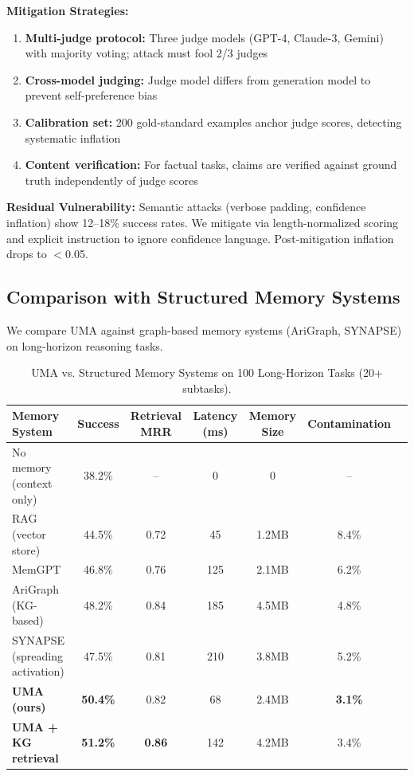 \documentclass{article}
\theoremstyle{plain}
\theoremstyle{definition}
\theoremstyle{remark}
\begin{document}
\textbf{Mitigation Strategies:}
\begin{enumerate}[nosep,leftmargin=*]
	\item \textbf{Multi-judge protocol:} Three judge models (GPT-4, Claude-3, Gemini) with majority voting; attack must fool 2/3 judges
	\item \textbf{Cross-model judging:} Judge model differs from generation model to prevent self-preference bias
	\item \textbf{Calibration set:} 200 gold-standard examples anchor judge scores, detecting systematic inflation
	\item \textbf{Content verification:} For factual tasks, claims are verified against ground truth independently of judge scores
\end{enumerate}

\textbf{Residual Vulnerability:} Semantic attacks (verbose padding, confidence inflation) show 12--18\% success rates. We mitigate via length-normalized scoring and explicit instruction to ignore confidence language. Post-mitigation inflation drops to $<$0.05.

\subsection{Comparison with Structured Memory Systems}
\label{sec:memory_comparison}

We compare UMA against graph-based memory systems (AriGraph, SYNAPSE) on long-horizon reasoning tasks.

\begin{table}[h]
	\caption{UMA vs. Structured Memory Systems on 100 Long-Horizon Tasks (20+ subtasks).}
	\label{tab:memory_systems}
	\centering
	\small
	\begin{tabular}{@{}lcccccc@{}}
		\toprule
		\textbf{Memory System} & \textbf{Success} & \textbf{Retrieval MRR} & \textbf{Latency (ms)} & \textbf{Memory Size} & \textbf{Contamination} \\
		\midrule
		No memory (context only) & 38.2\% & -- & 0 & 0 & -- \\
		RAG (vector store) & 44.5\% & 0.72 & 45 & 1.2MB & 8.4\% \\
		MemGPT & 46.8\% & 0.76 & 125 & 2.1MB & 6.2\% \\
		\midrule
		AriGraph (KG-based) & 48.2\% & 0.84 & 185 & 4.5MB & 4.8\% \\
		SYNAPSE (spreading activation) & 47.5\% & 0.81 & 210 & 3.8MB & 5.2\% \\
		\midrule
		\textbf{UMA (ours)} & \textbf{50.4\%} & 0.82 & 68 & 2.4MB & \textbf{3.1\%} \\
		\textbf{UMA + KG retrieval} & \textbf{51.2\%} & \textbf{0.86} & 142 & 4.2MB & 3.4\% \\
		\bottomrule
	\end{tabular}
\end{table}
\end{document}
